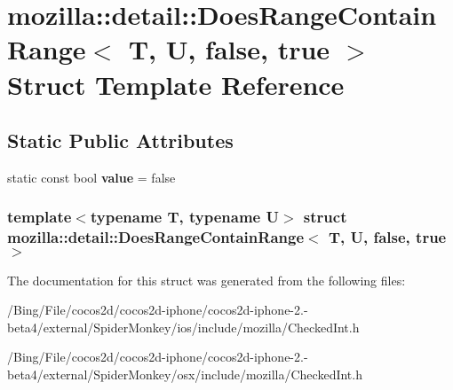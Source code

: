 \hypertarget{structmozilla_1_1detail_1_1_does_range_contain_range_3_01_t_00_01_u_00_01false_00_01true_01_4}{\section{mozilla\-:\-:detail\-:\-:Does\-Range\-Contain\-Range$<$ T, U, false, true $>$ Struct Template Reference}
\label{structmozilla_1_1detail_1_1_does_range_contain_range_3_01_t_00_01_u_00_01false_00_01true_01_4}
}
\subsection*{Static Public Attributes}
\begin{DoxyCompactItemize}
\item 
\hypertarget{structmozilla_1_1detail_1_1_does_range_contain_range_3_01_t_00_01_u_00_01false_00_01true_01_4_a1090e72656dcf7217cbe52d166dbcdc8}{static const bool {\bfseries value} = false}\label{structmozilla_1_1detail_1_1_does_range_contain_range_3_01_t_00_01_u_00_01false_00_01true_01_4_a1090e72656dcf7217cbe52d166dbcdc8}

\end{DoxyCompactItemize}
\subsubsection*{template$<$typename T, typename U$>$ struct mozilla\-::detail\-::\-Does\-Range\-Contain\-Range$<$ T, U, false, true $>$}



The documentation for this struct was generated from the following files\-:\begin{DoxyCompactItemize}
\item 
/\-Bing/\-File/cocos2d/cocos2d-\/iphone/cocos2d-\/iphone-\/2.-\/beta4/external/\-Spider\-Monkey/ios/include/mozilla/Checked\-Int.\-h\item 
/\-Bing/\-File/cocos2d/cocos2d-\/iphone/cocos2d-\/iphone-\/2.-\/beta4/external/\-Spider\-Monkey/osx/include/mozilla/Checked\-Int.\-h\end{DoxyCompactItemize}

